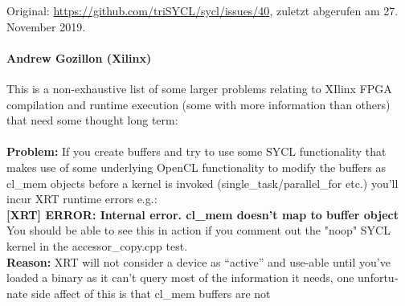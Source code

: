 Original: \url{https://github.com/triSYCL/sycl/issues/40}, zuletzt abgerufen am
27. November 2019.

\begin{otherlanguage}{english}
    \paragraph{Andrew Gozillon (Xilinx)} This is a non-exhaustive list of some
                                         larger problems relating to XIlinx FPGA
                                         compilation and runtime execution (some
                                         with more information than others) that
                                         need some thought long term:\\
                                         \\
                                         \textbf{Problem:} If you create buffers
                                         and try to use some SYCL functionality
                                         that makes use of some underlying
                                         OpenCL functionality to modify the
                                         buffers as cl\_mem objects before a
                                         kernel is invoked
                                         (single\_task/parallel\_for etc.)
                                         you'll incur XRT runtime errors e.g.:
                                         \\
                                         \textbf{[XRT] ERROR: Internal error.
                                         cl\_mem doesn't map to buffer object}
                                         \\
                                         You should be able to see this in
                                         action if you comment out the "noop"
                                         SYCL kernel in the accessor\_copy.cpp
                                         test.
                                         \\
                                         \textbf{Reason:} XRT will not consider
                                         a device as ``active'' and use-able
                                         until you've loaded a binary as it
                                         can't query most of the information it
                                         needs, one unfortunate side affect of
                                         this is that cl\_mem buffers are not

\end{otherlanguage}
